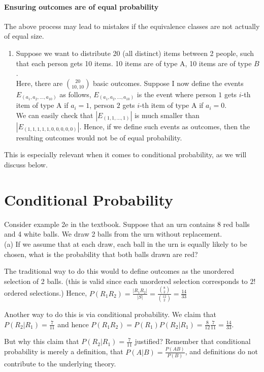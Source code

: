 \documentclass{article}
\begin{document}
\paragraph{Ensuring outcomes are of equal probability}
The above process may lead to mistakes if the equivalence classes are not actually of equal size.

\begin{enumerate}
	\item Suppose we want to distribute 20 (all distinct) items between 2 people, such that each person gets 10 items. 10 items are of type A, 10 items are of type $B$.\\
	Here, there are $\binom{20}{10,10}$ basic outcomes.
	Suppose I now define the events $E_{(a_1, a_2,...,a_{10})}$ as follows, $E_{(a_1, a_2,...,a_{10})}$ is the event where person $1$ gets $i$-th item of type A if $a_i=1$, person $2$ gets $i$-th item of type A if $a_i=0$. \\
	We can easily check that $|E_{(1, 1,...,1)}|$ is much smaller than $|E_{(1, 1, 1, 1, 1, 0, 0, 0, 0, 0)}|$. Hence, if we define such events as outcomes, then the resulting outcomes would not be of equal probability.
\end{enumerate}


This is especially relevant when it comes to conditional probability, as we will discuss below.



\section{Conditional Probability}
Consider example 2e in the textbook.
Suppose that an urn contains 8 red balls and 4 white balls. We draw 2 balls from the urn without replacement. \\
(a) If we assume that at each draw, each ball in the urn is equally likely to be chosen, what is the probability that both balls drawn are red?

The traditional way to do this would to define outcomes as the unordered selection of 2 balls. (this is valid since each unordered selection corresponds to $2!$ ordered selections.) Hence, $P(R_1R_2)=\frac{|R_1R_2|}{|S|}=\frac{\binom{8}{2}}{\binom{12}{2}}=\frac{14}{33}$

Another way to do this is via conditional probability. We claim that $P(R_2|R_1)=\frac{7}{11}$ and hence $P(R_1R_2)=P(R_1)P(R_2|R_1)=\frac{8}{12}\frac{7}{11}=\frac{14}{33}$.

But why this claim that $P(R_2|R_1)=\frac{7}{11}$ justified? Remember that conditional probability is merely a definition, that $P(A|B)=\frac{P(AB)}{P(B)}$, and definitions do not contribute to the underlying theory.
\end{document}
